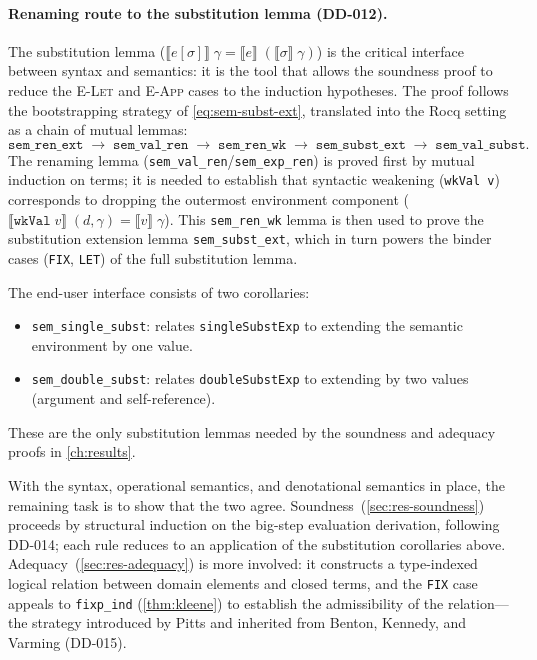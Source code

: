 \paragraph{Renaming route to the substitution lemma (DD-012).}
The substitution lemma
($\llbracket e[\sigma] \rrbracket\;\gamma =
 \llbracket e \rrbracket\;(\llbracket \sigma \rrbracket\;\gamma)$)
is the critical interface between syntax and semantics: it is the tool
that allows the soundness proof to reduce the \textsc{E-Let} and
\textsc{E-App} cases to the induction hypotheses.  The proof follows
the bootstrapping strategy of \cref{eq:sem-subst-ext}, translated into
the Rocq setting as a chain of mutual lemmas:
\[
  \texttt{sem\_ren\_ext}
    \;\to\; \texttt{sem\_val\_ren}
    \;\to\; \texttt{sem\_ren\_wk}
    \;\to\; \texttt{sem\_subst\_ext}
    \;\to\; \texttt{sem\_val\_subst}.
\]
The renaming lemma (\texttt{sem\_val\_ren}/\texttt{sem\_exp\_ren})
is proved first by mutual induction on terms; it is needed to
establish that syntactic weakening (\texttt{wkVal~v}) corresponds to
dropping the outermost environment component
($\llbracket \texttt{wkVal}\;v \rrbracket\;(d,\gamma)
= \llbracket v \rrbracket\;\gamma$).  This \texttt{sem\_ren\_wk}
lemma is then used to prove the substitution extension lemma
\texttt{sem\_subst\_ext}, which in turn powers the binder cases
(\texttt{FIX}, \texttt{LET}) of the full substitution lemma.

The end-user interface consists of two corollaries:
\begin{itemize}
  \item \texttt{sem\_single\_subst}: relates \texttt{singleSubstExp} to
    extending the semantic environment by one value.
  \item \texttt{sem\_double\_subst}: relates \texttt{doubleSubstExp} to
    extending by two values (argument and self-reference).
\end{itemize}
These are the only substitution lemmas needed by the soundness and
adequacy proofs in \cref{ch:results}.

\medskip

With the syntax, operational semantics, and denotational semantics in
place, the remaining task is to show that the two agree.
Soundness~(\cref{sec:res-soundness}) proceeds by structural induction
on the big-step evaluation derivation, following DD-014; each rule
reduces to an application of the substitution corollaries above.
Adequacy~(\cref{sec:res-adequacy}) is more involved: it constructs a
type-indexed logical relation between domain elements and closed terms,
and the \texttt{FIX} case appeals to \texttt{fixp\_ind}
(\cref{thm:kleene}) to establish the admissibility of the
relation---the strategy introduced by Pitts and inherited from
Benton, Kennedy, and Varming (DD-015).
